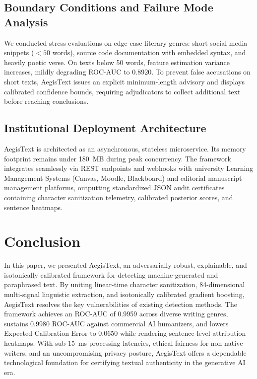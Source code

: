 \documentclass[conference]{IEEEtran}
\begin{document}
\subsection{Boundary Conditions and Failure Mode Analysis}
We conducted stress evaluations on edge-case literary genres: short social media snippets ($< 50$ words), source code documentation with embedded syntax, and heavily poetic verse. On texts below 50 words, feature estimation variance increases, mildly degrading ROC-AUC to 0.8920. To prevent false accusations on short texts, AegisText issues an explicit minimum-length advisory and displays calibrated confidence bounds, requiring adjudicators to collect additional text before reaching conclusions.

\subsection{Institutional Deployment Architecture}
AegisText is architected as an asynchronous, stateless microservice. Its memory footprint remains under 180~MB during peak concurrency. The framework integrates seamlessly via REST endpoints and webhooks with university Learning Management Systems (Canvas, Moodle, Blackboard) and editorial manuscript management platforms, outputting standardized JSON audit certificates containing character sanitization telemetry, calibrated posterior scores, and sentence heatmaps.

\section{Conclusion}
In this paper, we presented AegisText, an adversarially robust, explainable, and isotonically calibrated framework for detecting machine-generated and paraphrased text. By uniting linear-time character sanitization, 84-dimensional multi-signal linguistic extraction, and isotonically calibrated gradient boosting, AegisText resolves the key vulnerabilities of existing detection methods. The framework achieves an ROC-AUC of 0.9959 across diverse writing genres, sustains 0.9980 ROC-AUC against commercial AI humanizers, and lowers Expected Calibration Error to 0.0650 while rendering sentence-level attribution heatmaps. With sub-15~ms processing latencies, ethical fairness for non-native writers, and an uncompromising privacy posture, AegisText offers a dependable technological foundation for certifying textual authenticity in the generative AI era.
\end{document}
